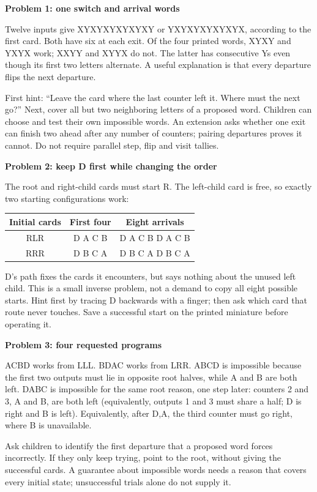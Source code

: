 \documentclass[11pt]{article}
\newcommand{\prob}[1]{\vspace{3pt}\textbf{#1}\par}
\begin{document}
\prob{Problem 1: one switch and arrival words}
Twelve inputs give XYXYXYXYXYXY or YXYXYXYXYXYX, according to the first card. Both have six at each exit. Of the four printed words, XYXY and YXYX work; XXYY and XYYX do not. The latter has consecutive Ys even though its first two letters alternate. A useful explanation is that every departure flips the next departure.

First hint: ``Leave the card where the last counter left it. Where must the next go?'' Next, cover all but two neighboring letters of a proposed word. Children can choose and test their own impossible words. An extension asks whether one exit can finish two ahead after any number of counters; pairing departures proves it cannot. Do not require parallel step, flip and visit tallies.

\prob{Problem 2: keep D first while changing the order}
The root and right-child cards must start R. The left-child card is free, so exactly two starting configurations work:
\begin{center}
\begin{tabular}{ccc}\toprule
Initial cards & First four & Eight arrivals\\\midrule
RLR & D A C B & D A C B D A C B\\
RRR & D B C A & D B C A D B C A\\\bottomrule
\end{tabular}
\end{center}
D's path fixes the cards it encounters, but says nothing about the unused left child. This is a small inverse problem, not a demand to copy all eight possible starts. Hint first by tracing D backwards with a finger; then ask which card that route never touches. Save a successful start on the printed miniature before operating it.

\prob{Problem 3: four requested programs}
ACBD works from LLL. BDAC works from LRR. ABCD is impossible because the first two outputs must lie in opposite root halves, while A and B are both left. DABC is impossible for the same root reason, one step later: counters 2 and 3, A and B, are both left (equivalently, outputs 1 and 3 must share a half; D is right and B is left). Equivalently, after D,A, the third counter must go right, where B is unavailable.

Ask children to identify the first departure that a proposed word forces incorrectly. If they only keep trying, point to the root, without giving the successful cards. A guarantee about impossible words needs a reason that covers every initial state; unsuccessful trials alone do not supply it.
\end{document}

